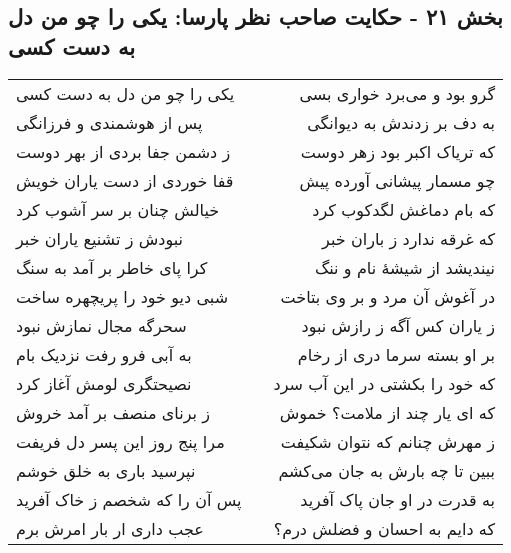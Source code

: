 \begin{center}
\section*{بخش ۲۱ - حکایت صاحب نظر پارسا: یکی را چو من دل به دست کسی}
\label{sec:021}
\begin{longtable}{l p{0.5cm} r}
یکی را چو من دل به دست کسی
&&
گرو بود و می‌برد خواری بسی
\\
پس از هوشمندی و فرزانگی
&&
به دف بر زدندش به دیوانگی
\\
ز دشمن جفا بردی از بهر دوست
&&
که تریاک اکبر بود زهر دوست
\\
قفا خوردی از دست یاران خویش
&&
چو مسمار پیشانی آورده پیش
\\
خیالش چنان بر سر آشوب کرد
&&
که بام دماغش لگدکوب کرد
\\
نبودش ز تشنیع یاران خبر
&&
که غرقه ندارد ز باران خبر
\\
کرا پای خاطر بر آمد به سنگ
&&
نیندیشد از شیشهٔ نام و ننگ
\\
شبی دیو خود را پریچهره ساخت
&&
در آغوش آن مرد و بر وی بتاخت
\\
سحرگه مجال نمازش نبود
&&
ز یاران کس آگه ز رازش نبود
\\
به آبی فرو رفت نزدیک بام
&&
بر او بسته سرما دری از رخام
\\
نصیحتگری لومش آغاز کرد
&&
که خود را بکشتی در این آب سرد
\\
ز برنای منصف بر آمد خروش
&&
که ای یار چند از ملامت؟ خموش
\\
مرا پنج روز این پسر دل فریفت
&&
ز مهرش چنانم که نتوان شکیفت
\\
نپرسید باری به خلق خوشم
&&
ببین تا چه بارش به جان می‌کشم
\\
پس آن را که شخصم ز خاک آفرید
&&
به قدرت در او جان پاک آفرید
\\
عجب داری ار بار امرش برم
&&
که دایم به احسان و فضلش درم؟
\\
\end{longtable}
\end{center}
